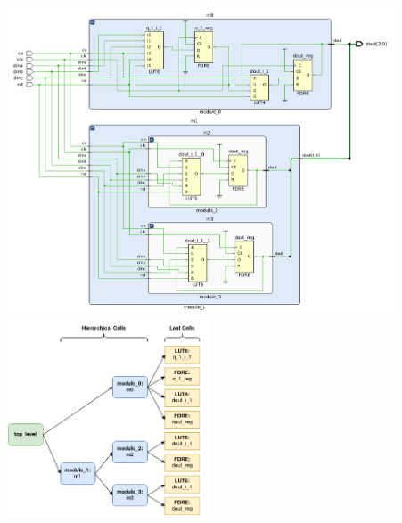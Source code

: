 {
    \centering
    \includegraphics[valign=c, width=11.5cm]{figures/netlist_synth/hier_netlist.png}
    \includegraphics[valign=c, width=6cm]{figures/netlist_synth/hier_graph.png}
    \label{fig:hier_netlist}
}
\vspace{0.5cm}
